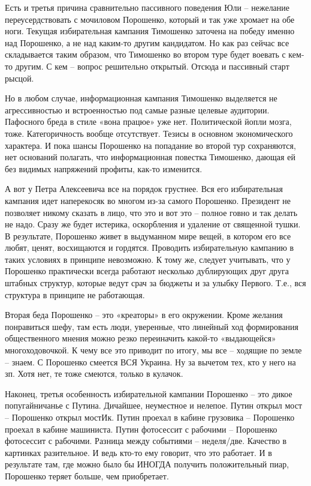 Есть и третья причина сравнительно пассивного поведения Юли – нежелание
переусердствовать с мочиловом Порошенко, который и так уже хромает на обе ноги.
Текущая избирательная кампания Тимошенко заточена на победу именно над
Порошенко, а не над каким-то другим кандидатом. Но как раз сейчас все
складывается таким образом, что Тимошенко во втором туре будет воевать с кем-то
другим. С кем – вопрос решительно открытый. Отсюда и пассивный старт рысцой.

Но в любом случае, информационная кампания Тимошенко выделяется не
агрессивностью и встроенностью под самые разные целевые аудитории. Пафосного
бреда в стиле «вона працюе» уже нет. Политической йопли мозга, тоже.
Категоричность вообще отсутствует. Тезисы в основном экономического характера.
И пока шансы Порошенко на попадание во второй тур сохраняются, нет оснований
полагать, что информационная повестка Тимошенко, дающая ей без видимых
напряжений профиты, как-то изменится.

А вот у Петра Алексеевича все на порядок грустнее. Вся его избирательная
кампания идет наперекосяк во многом из-за самого Порошенко. Президент не
позволяет никому сказать в лицо, что это и вот это – полное говно и так делать
не надо. Сразу же будет истерика, оскорбления и удаление от священной тушки. В
результате, Порошенко живет в выдуманном мире вещей, в котором его все любят,
ценят, восхищаются и гордятся. Проводить избирательную кампанию в таких
условиях в принципе невозможно. К тому же, следует учитывать, что у Порошенко
практически всегда работают несколько дублирующих друг друга штабных структур,
которые ведут срач за бюджеты и за улыбку Первого. Т.е., вся структура в
принципе не работающая.

Вторая беда Порошенко – это «креаторы» в его окружении. Кроме желания
понравиться шефу, там есть люди, уверенные, что линейный ход формирования
общественного мнения можно резко переиначить какой-то «выдающейся»
многоходовочкой. К чему все это приводит по итогу, мы все – ходящие по земле –
знаем. С Порошенко смеется ВСЯ Украина. Ну за вычетом тех, кто у него на зп.
Хотя нет, те тоже смеются, только в кулачок.

Наконец, третья особенность избирательной кампании Порошенко – это дикое
попугайничанье с Путина. Дичайшее, неуместное и нелепое. Путин открыл мост –
Порошенко открыл мостИк. Путин проехал в кабине грузовика – Порошенко проехал в
кабине машиниста. Путин фотосессит с рабочими – Порошенко фотосессит с
рабочими. Разница между событиями – неделя/две. Качество в картинках
разительное. И ведь кто-то ему говорит, что это работает. И в результате там,
где можно было бы ИНОГДА получить положительный пиар, Порошенко теряет больше,
чем приобретает.

